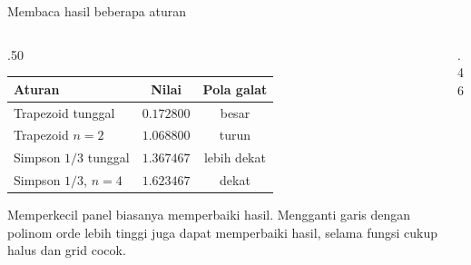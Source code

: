 \documentclass[aspectratio=169,10pt]{beamer}
\begin{document}
\begin{frame}{Membaca hasil beberapa aturan}
\scriptsize
\begin{columns}[T,totalwidth=\textwidth]
\begin{column}{.50\textwidth}
\begin{greenbox}
\begin{tabular}{lcc}
\toprule
Aturan & Nilai & Pola galat\\\midrule
Trapezoid tunggal & $0.172800$ & besar\\
Trapezoid $n=2$ & $1.068800$ & turun\\
Simpson $1/3$ tunggal & $1.367467$ & lebih dekat\\
Simpson $1/3$, $n=4$ & $1.623467$ & dekat\\
\bottomrule
\end{tabular}
\end{greenbox}
\begin{orangebox}[Interpretasi]
Memperkecil panel biasanya memperbaiki hasil. Mengganti garis dengan polinom orde lebih tinggi juga dapat memperbaiki hasil, selama fungsi cukup halus dan grid cocok.
\end{orangebox}
\end{column}
\begin{column}{.46\textwidth}
\end{column}
\end{columns}
\end{frame}
\end{document}
